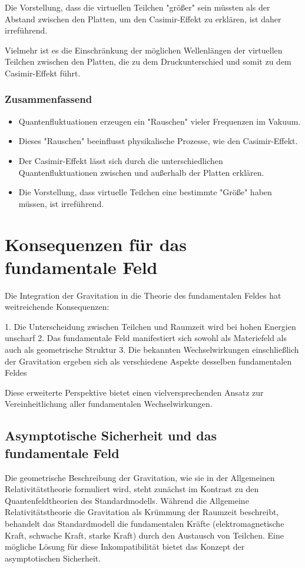 \documentclass{article}
\begin{document}
Die Vorstellung, dass die virtuellen Teilchen "größer" sein müssten als der Abstand zwischen den Platten, um den Casimir-Effekt zu erklären, ist daher irreführend.

Vielmehr ist es die Einschränkung der möglichen Wellenlängen der virtuellen Teilchen zwischen den Platten, die zu dem Druckunterschied und somit zu dem Casimir-Effekt führt.

\subsubsection{Zusammenfassend}

\begin{itemize}
	\item Quantenfluktuationen erzeugen ein "Rauschen" vieler Frequenzen im Vakuum.
	\item Dieses "Rauschen" beeinflusst physikalische Prozesse, wie den Casimir-Effekt.
	\item Der Casimir-Effekt lässt sich durch die unterschiedlichen Quantenfluktuationen zwischen und außerhalb der Platten erklären.
	\item Die Vorstellung, dass virtuelle Teilchen eine bestimmte "Größe" haben müssen, ist irreführend.
\end{itemize}

\section{Konsequenzen für das fundamentale Feld}

Die Integration der Gravitation in die Theorie des fundamentalen Feldes hat weitreichende Konsequenzen:

1. Die Unterscheidung zwischen Teilchen und Raumzeit wird bei hohen Energien unscharf
2. Das fundamentale Feld manifestiert sich sowohl als Materiefeld als auch als geometrische Struktur
3. Die bekannten Wechselwirkungen einschließlich der Gravitation ergeben sich als verschiedene Aspekte desselben fundamentalen Feldes

Diese erweiterte Perspektive bietet einen vielversprechenden Ansatz zur Vereinheitlichung aller fundamentalen Wechselwirkungen.

\subsection{Asymptotische Sicherheit und das fundamentale Feld}

Die geometrische Beschreibung der Gravitation, wie sie in der Allgemeinen Relativitätstheorie formuliert wird, steht zunächst im Kontrast zu den Quantenfeldtheorien des Standardmodells. Während die Allgemeine Relativitätstheorie die Gravitation als Krümmung der Raumzeit beschreibt, behandelt das Standardmodell die fundamentalen Kräfte (elektromagnetische Kraft, schwache Kraft, starke Kraft) durch den Austausch von Teilchen. Eine mögliche Lösung für diese Inkompatibilität bietet das Konzept der asymptotischen Sicherheit.
\end{document}
